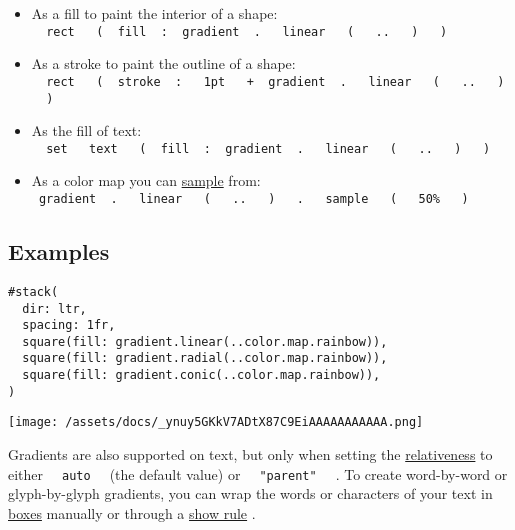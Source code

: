 \begin{itemize}
\tightlist
\item
  As a fill to paint the interior of a shape:
  \texttt{\ }{\texttt{\ rect\ }}\texttt{\ }{\texttt{\ (\ }}\texttt{\ fill\ }{\texttt{\ :\ }}\texttt{\ gradient\ }{\texttt{\ .\ }}\texttt{\ }{\texttt{\ linear\ }}\texttt{\ }{\texttt{\ (\ }}\texttt{\ }{\texttt{\ ..\ }}\texttt{\ }{\texttt{\ )\ }}\texttt{\ }{\texttt{\ )\ }}\texttt{\ }
\item
  As a stroke to paint the outline of a shape:
  \texttt{\ }{\texttt{\ rect\ }}\texttt{\ }{\texttt{\ (\ }}\texttt{\ stroke\ }{\texttt{\ :\ }}\texttt{\ }{\texttt{\ 1pt\ }}\texttt{\ }{\texttt{\ +\ }}\texttt{\ gradient\ }{\texttt{\ .\ }}\texttt{\ }{\texttt{\ linear\ }}\texttt{\ }{\texttt{\ (\ }}\texttt{\ }{\texttt{\ ..\ }}\texttt{\ }{\texttt{\ )\ }}\texttt{\ }{\texttt{\ )\ }}\texttt{\ }
\item
  As the fill of text:
  \texttt{\ }{\texttt{\ set\ }}\texttt{\ }{\texttt{\ text\ }}\texttt{\ }{\texttt{\ (\ }}\texttt{\ fill\ }{\texttt{\ :\ }}\texttt{\ gradient\ }{\texttt{\ .\ }}\texttt{\ }{\texttt{\ linear\ }}\texttt{\ }{\texttt{\ (\ }}\texttt{\ }{\texttt{\ ..\ }}\texttt{\ }{\texttt{\ )\ }}\texttt{\ }{\texttt{\ )\ }}\texttt{\ }
\item
  As a color map you can
  \href{/docs/reference/visualize/gradient/\#definitions-sample}{sample}
  from:
  \texttt{\ gradient\ }{\texttt{\ .\ }}\texttt{\ }{\texttt{\ linear\ }}\texttt{\ }{\texttt{\ (\ }}\texttt{\ }{\texttt{\ ..\ }}\texttt{\ }{\texttt{\ )\ }}\texttt{\ }{\texttt{\ .\ }}\texttt{\ }{\texttt{\ sample\ }}\texttt{\ }{\texttt{\ (\ }}\texttt{\ }{\texttt{\ 50\%\ }}\texttt{\ }{\texttt{\ )\ }}\texttt{\ }
\end{itemize}

\subsection{Examples}\label{examples}

\begin{verbatim}
#stack(
  dir: ltr,
  spacing: 1fr,
  square(fill: gradient.linear(..color.map.rainbow)),
  square(fill: gradient.radial(..color.map.rainbow)),
  square(fill: gradient.conic(..color.map.rainbow)),
)
\end{verbatim}

\texttt{[image: /assets/docs/\_ynuy5GKkV7ADtX87C9EiAAAAAAAAAAA.png]}

Gradients are also supported on text, but only when setting the
\href{/docs/reference/visualize/gradient/\#definitions-relative}{relativeness}
to either \texttt{\ }{\texttt{\ auto\ }}\texttt{\ } (the default value)
or \texttt{\ }{\texttt{\ "parent"\ }}\texttt{\ } . To create
word-by-word or glyph-by-glyph gradients, you can wrap the words or
characters of your text in \href{/docs/reference/layout/box/}{boxes}
manually or through a \href{/docs/reference/styling/\#show-rules}{show
rule} .

